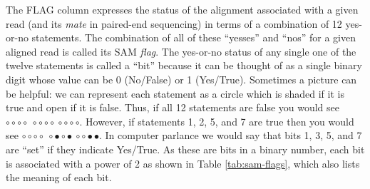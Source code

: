 \documentclass[]{krantz}
\begin{document}
The FLAG column expresses the status of
the alignment associated with a given read (and its \emph{mate} in paired-end
sequencing) in terms of a combination of
12 yes-or-no statements. The combination of all of these ``yesses'' and ``nos'' for a
given aligned read is
called its SAM \emph{flag}. The yes-or-no status of any single one of the twelve statements is called a ``bit'' because it can be
thought of as a single binary digit
whose value can be 0 (No/False) or 1 (Yes/True). Sometimes a picture can be helpful:
we can represent each statement as a circle which is shaded if it is true and open
if it is false. Thus, if all 12 statements are false you would see \({\circ}{\circ}{\circ}{\circ}~{\circ}{\circ}{\circ}{\circ}~{\circ}{\circ}{\circ}{\circ}\). However,
if statements 1, 2, 5, and 7 are true then you would see \({\circ}{\circ}{\circ}{\circ}~{\circ}{\bullet}{\circ}{\bullet}~{\circ}{\circ}{\bullet}{\bullet}\). In computer parlance
we would say that bits 1, 3, 5, and 7 are ``set'' if they indicate Yes/True. As these are bits
in a binary number, each bit is associated with a power of 2 as shown in Table \ref{tab:sam-flags},
which also lists the meaning of each bit.
\end{document}
